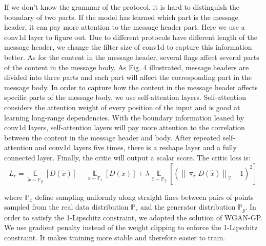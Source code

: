 If we don't know the grammar of the protocol, it is hard to distinguish the boundary of two parts. If the model has learned which part is the message header, it can pay more attention to the message header part.
Here we use a conv1d layer to figure out. Due to different protocols have different length of the message header, we change the filter size of conv1d to capture this information better.
As for the content in the message header, several flags affect several parts of the content in the message body. As \textcolor[rgb]{1,0,0}{Fig. 4} illustrated, message headers are divided into three parts and each part will affect the corresponding part in the message body. In order to capture how the content in the message header affects specific parts of the message body, we use self-attention layers. 
Self-attention considers the attention weight of every position of the input and is good at learning long-range dependencies. With the boundary information leaned by conv1d layers, self-attention layers will pay more attention to the correlation between the content in the message header and body.
After repeated self-attention and conv1d layers five times, there is a reshape layer and a fully connected layer. Finally, the critic will output a scalar score. 
The critic loss is:
\begin{equation}
L_{c} = \mathop{\mathbb{E}}\limits_{\tilde{x}\sim\mathbb{P}_{g}}\left [ D(\tilde{x}) \right ] 
- \mathop{\mathbb{E}}\limits_{x\sim\mathbb{P}_{r}}\left [ D(x) \right ] 
+ \lambda\mathop{\mathbb{E}}\limits_{\hat{x}\sim\mathbb{P}_{\hat{x}}}\left [ ( \left \| \triangledown_{\hat{x}}D( \hat{x}) \right \|_{2} - 1 )^{2} \right ]
\end{equation}

where $\mathbb{P}_{\tilde{x}}$ define sampling uniformly along straight lines between pairs of points sampled from the real data distribution $\mathbb{P}_{r}$ and the generator distribution $\mathbb{P}_{g}$. 
In order to satisfy the 1-Lipschitz constraint, we adopted the solution of WGAN-GP. We use gradient penalty instead of the weight clipping to enforce the 1-Lipschitz constraint. It makes training more stable and therefore easier to train.

